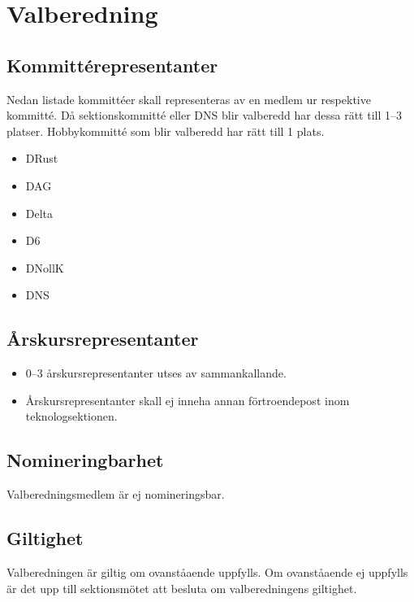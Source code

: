 \section{Valberedning}
\subsection{Kommittérepresentanter}
Nedan listade kommittéer skall representeras av en medlem ur respektive kommitté. Då sektionskommitté eller DNS blir valberedd har dessa rätt till 1--3 platser. Hobbykommitté som blir valberedd har rätt till 1 plats. 
\begin{itemize}
  \item DRust
  \item DAG 
  \item Delta 
  \item D6 
  \item DNollK
  \item DNS
\end{itemize}
\subsection{Årskursrepresentanter}
\begin{itemize}
  \item 0--3 årskursrepresentanter utses av sammankallande. 
  \item Årskursrepresentanter skall ej inneha annan förtroendepost inom teknologsektionen. 
\end{itemize}
\subsection{Nomineringbarhet}
Valberedningsmedlem är ej nomineringsbar.
\subsection{Giltighet}
Valberedningen är giltig om ovanståaende uppfylls. Om ovanståaende ej uppfylls är det upp till sektionsmötet att besluta om valberedningens giltighet.
